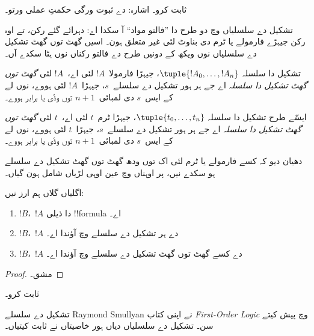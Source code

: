 \documentclass[../../../include/open-logic-section]{subfiles}
\begin{document}
\begin{prob}
 ثابت کرو۔
اشارہ: 
دے ثبوت ورگی حکمتِ عملی ورتو۔
\end{prob}

تشکیل دے سلسلیاں وچ دو طرح دا ”فالتو مواد“ آ
سکدا اے: دہرائے گئے رکن، تے اوہ رکن جیہڑے
فارمولے یا ٹرم دی بناوٹ لئی غیر متعلق ہون۔
اسیں گھٹ توں گھٹ تشکیل دے سلسلیاں نوں ویکھ
کے دونیں طرح دے فالتو رکناں نوں ہٹا سکدے آں۔

\begin{defn}
تشکیل دا سلسلہ $\tuple{!A_0, \ldots, !A_n}$،
جیہڑا فارمولا~$!A$ لئی اے،~$!A$ لئی
\emph{گھٹ توں گھٹ تشکیل دا سلسلہ} اے جے
ہر ہور تشکیل دے سلسلے~$s$، جیہڑا~$!A$ لئی ہووے،
نوں لے کے ایس~$s$ دی لمبائی~$n+1$ توں وڈّی
یا برابر ہووے۔

ایسّے طرح تشکیل دا سلسلہ $\tuple{t_0, \ldots, t_n}$،
جیہڑا ٹرم~$t$ لئی اے،~$t$ لئی
\emph{گھٹ توں گھٹ تشکیل دا سلسلہ} اے جے
ہر ہور تشکیل دے سلسلے~$s$، جیہڑا~$t$ لئی ہووے،
نوں لے کے ایس~$s$ دی لمبائی~$n+1$ توں وڈّی
یا برابر ہووے۔
\end{defn}

دھیان دیو کہ کسے فارمولے یا ٹرم لئی اک توں
ودھ گھٹ توں گھٹ تشکیل دے سلسلے ہو سکدے نیں،
پر اوہناں وچ عین اوہی لڑیاں شامل ہون گیاں۔

\begin{prop}
اگلیاں گلاں ہم ارز نیں:
\begin{enumerate}
    \item $!B$،~$!A$ دا ذیلی !!{formula} اے۔
    \item $!B$،~$!A$ دے ہر تشکیل دے سلسلے وچ آؤندا اے۔
    \item $!B$،~$!A$ دے کسے گھٹ توں گھٹ تشکیل دے سلسلے وچ آؤندا اے۔
\end{enumerate}
\end{prop}

\begin{proof}
مشق۔
\end{proof}

\begin{prob}
 ثابت کرو۔
\end{prob}

\begin{history}
تشکیل دے سلسلے Raymond Smullyan نے اپنی
کتاب \emph{First-Order Logic} \citep{Smullyan1968}
وچ پیش کیتے سن۔ تشکیل دے سلسلیاں دیاں ہور خاصیتاں
\citet{Zuckerman1973} نے ثابت کیتیاں۔
\end{history}
\end{document}
